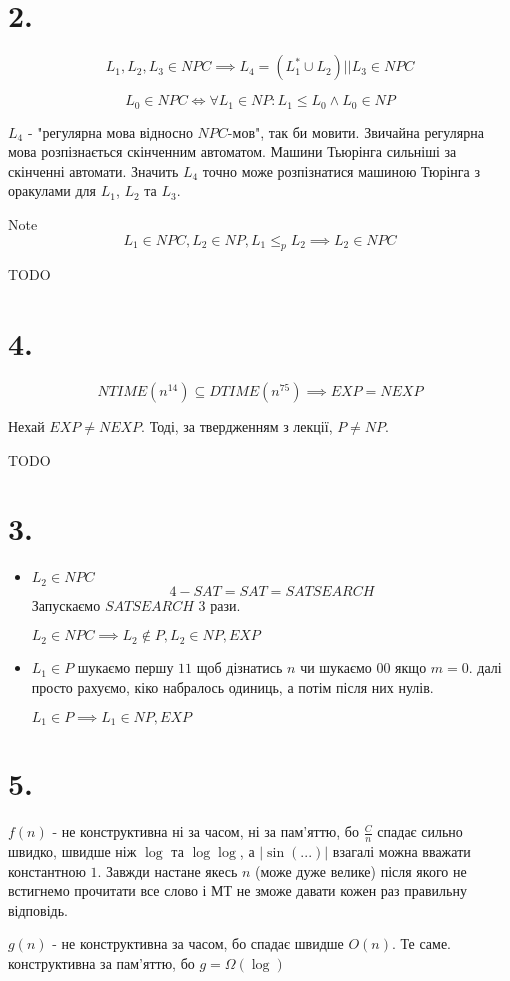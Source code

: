 \documentclass[11pt, a4paper]{article} %
\begin{document}
\section*{2.}
$$L_1, L_2, L_3 \in NPC \implies L_4 = (L_1^* \cup L_2) || L_3 \in NPC$$

$$L_0 \in NPC \iff \forall L_1 \in NP: L_1 \le L_0 \wedge L_0 \in NP$$

$L_4$ - "регулярна мова відносно $NPC$-мов", так би мовити. 
Звичайна регулярна мова розпізнається скінченним автоматом. Машини Тьюрінга сильніші за скінченні автомати.
Значить $L_4$ точно може розпізнатися машиною Тюрінга з оракулами для $L_1$, $L_2$ та $L_3$.

\begin{mdframed}
    Note
    $$L_1 \in NPC, L_2 \in NP, L_1 \le_p L_2 \implies L_2 \in NPC  $$
\end{mdframed}

TODO

\section*{4.}
$$NTIME(n^{14}) \subseteq DTIME(n^{75}) \implies EXP = NEXP$$

Нехай $EXP \ne NEXP$.
Тоді, за твердженням з лекції, $P \ne NP$.

TODO

\section*{3.}

\begin{itemize}
    \item $L_2 \in NPC$
    $$4-SAT = SAT = SAT SEARCH$$
    Запускаємо $SAT SEARCH$ 3 рази.

    $L_2 \in NPC \implies L_2 \notin P, L_2 \in NP, EXP$
    \item $L_1 \in P$
    шукаємо першу $11$ щоб дізнатись $n$ чи шукаємо $00$ якщо $m=0$. далі просто рахуємо, кіко набралось одиниць, а потім після них нулів.

    $L_1 \in P \implies L_1 \in NP, EXP$
\end{itemize}

\section*{5.}
$f(n)$ - не конструктивна ні за часом, ні за пам'яттю, бо $\frac{C}{n}$ спадає сильно швидко, швидше ніж $\log$ та $\log \log$, а $|\sin(...)|$ взагалі можна вважати константною $1$. 
Завжди настане якесь $n$ (може дуже велике) після якого не встигнемо прочитати все слово і МТ не зможе давати кожен раз правильну відповідь.

$g(n)$ - не конструктивна за часом, бо спадає швидше $O(n)$. Те саме.
конструктивна за пам'яттю, бо $g = \Omega(\log)$
\end{document}
